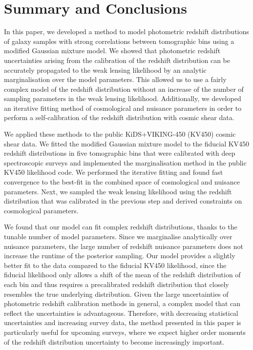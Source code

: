 \documentclass{aa}
\begin{document}
\section{Summary and Conclusions}
\label{sec:discussion}
In this paper, we developed a method to model photometric redshift distributions of galaxy samples with strong correlations between tomographic bins using a modified Gaussian mixture model. We showed that photometric redshift uncertainties arising from the calibration of the redshift distribution can be accurately propagated to the weak lensing likelihood by an analytic marginalisation over the model parameters.  This allowed us to use a fairly complex model of the redshift distribution without an increase of the number of sampling parameters in the weak lensing likelihood. Additionally, we developed an iterative fitting method of cosmological and nuisance parameters in order to perform a self-calibration of the redshift distribution with cosmic shear data.

We applied these methods to the public KiDS+VIKING-450 (KV450) cosmic shear data. We fitted the modified Gaussian mixture model to the fiducial KV450 redshift distributions in five tomographic bins that were calibrated with deep spectroscopic surveys and implemented the marginalisation method in the public KV450 likelihood code. We performed the iterative fitting and found fast convergence to the best-fit in the combined space of cosmological and nuisance parameters. Next, we sampled the weak lensing likelihood using the redshift distribution that was calibrated in the previous step and derived constraints on cosmological parameters.

We found that our model can fit complex redshift distributions, thanks to the tunable number of model parameters. Since we marginalise analytically over nuisance parameters, the large number of redshift nuisance parameters does not increase the runtime of the posterior sampling. Our model provides a slightly better fit to the data compared to the fiducial KV450 likelihood, since the fiducial likelihood only allows a shift of the mean of the redshift distribution of each bin and thus requires a precalibrated redshift distribution that closely resembles the true underlying distribution. Given the large uncertainties of photometric redshift calibration methods in general, a complex model that can reflect the uncertainties is advantageous. Therefore, with decreasing statistical uncertainties and increasing survey data, the method presented in this paper is particularly useful for upcoming surveys, where we expect higher order moments of the redshift distribution uncertainty to become increasingly important.
\end{document}
